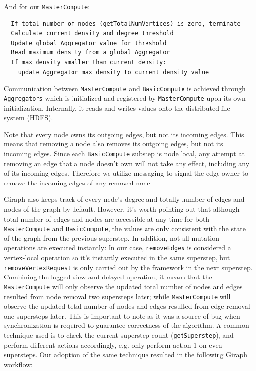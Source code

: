 \documentclass{article}
\begin{document}
And for our \texttt{MasterCompute}:

\begin{lstlisting}
  If total number of nodes (getTotalNumVertices) is zero, terminate
  Calculate current density and degree threshold
  Update global Aggregator value for threshold
  Read maximum density from a global Aggregator
  If max density smaller than current density:
    update Aggregator max density to current density value
\end{lstlisting}

Communication between \texttt{MasterCompute} and \texttt{BasicCompute} is achieved through \texttt{Aggregators} which is initialized and registered by \texttt{MasterCompute} upon its own initialization. Internally, it reads and writes values onto the distributed file system (HDFS).

Note that every node owns its outgoing edges, but not its incoming edges. This means that removing a node also removes its outgoing edges, but not its incoming edges. Since each \texttt{BasicCompute} substep is node local, any attempt at removing an edge that a node doesn't own will not take any effect, including any of its incoming edges. Therefore we utilize messaging to signal the edge owner to remove the incoming edges of any removed node.

Giraph also keeps track of every node's degree and totally number of edges and nodes of the graph by default. However, it's worth pointing out that although total number of edges and nodes are accessible at any time for both \texttt{MasterCompute} and \texttt{BasicCompute}, the values are only consistent with the state of the graph from the previous superstep. In addition, not all mutation operations are executed instantly: In our case, \texttt{removeEdges} is considered a vertex-local operation so it's instantly executed in the same superstep, but \texttt{removeVertexRequest} is only carried out by the framework in the next superstep. Combining the lagged view and delayed operation, it means that the \texttt{MasterCompute} will only observe the updated total number of nodes and edges resulted from node removal two supersteps later; while \texttt{MasterCompute} will observe the updated total number of nodes and edges resulted from edge removal one supersteps later. This is important to note as it was a source of bug when synchronization is required to guarantee correctness of the algorithm. A common technique used is to check the current superstep count (\texttt{getSuperstep}), and perform different actions accordingly, e.g. only perform action 1 on even supersteps. Our adoption of the same technique resulted in the following Giraph workflow:
\end{document}
